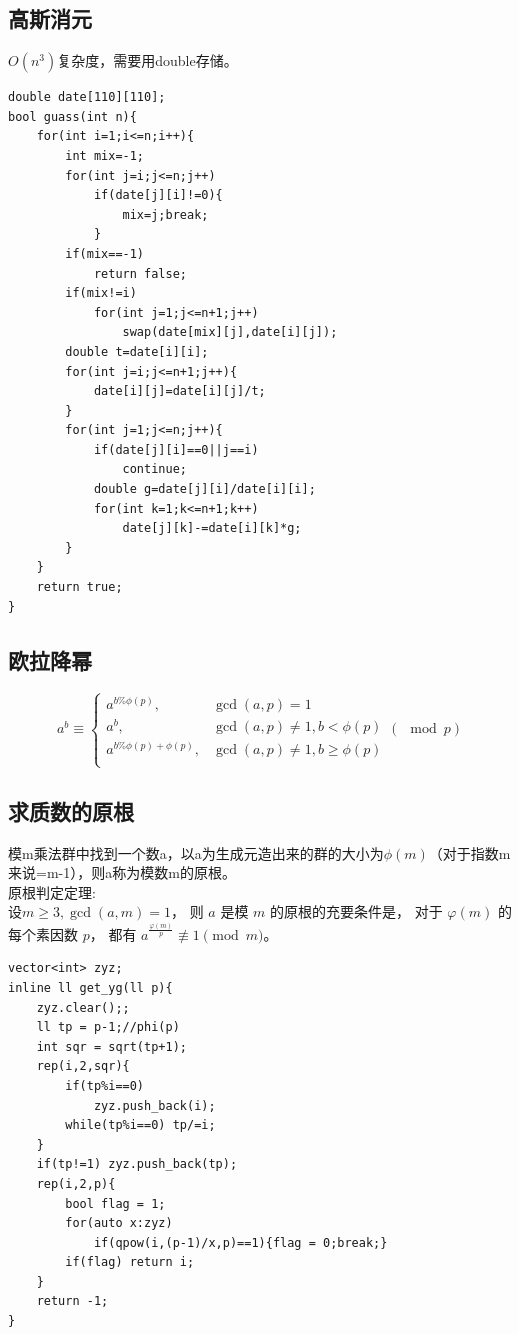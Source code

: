 \documentclass[a4]{ctexart}
\begin{document}
\subsection{高斯消元}
$O(n^3)$复杂度，需要用double存储。
\begin{lstlisting}
double date[110][110];
bool guass(int n){
    for(int i=1;i<=n;i++){
        int mix=-1;
        for(int j=i;j<=n;j++)
            if(date[j][i]!=0){
                mix=j;break;
            }
        if(mix==-1)
            return false;
        if(mix!=i)
            for(int j=1;j<=n+1;j++)
                swap(date[mix][j],date[i][j]);
        double t=date[i][i];
        for(int j=i;j<=n+1;j++){
            date[i][j]=date[i][j]/t;
        }
        for(int j=1;j<=n;j++){
            if(date[j][i]==0||j==i)
                continue;
            double g=date[j][i]/date[i][i];
            for(int k=1;k<=n+1;k++)
                date[j][k]-=date[i][k]*g;
        }
    }                                                                         
    return true;
}
\end{lstlisting}

\subsection{欧拉降幂}
$$
a^b \equiv \begin{cases}
a^{b\%\phi(p)} , & \gcd(a,p)=1\\
a^b , & \gcd(a,p)\neq 1,b<\phi(p)\\
a^{b\%\phi(p)+\phi(p)} , & \gcd(a,p)\neq 1 , b\geq \phi(p)\\
\end{cases}
(\mod p)
$$

\subsection{求质数的原根}
模m乘法群中找到一个数a，以a为生成元造出来的群的大小为$\phi(m)$（对于指数m来说=m-1），则a称为模数m的原根。\\
原根判定定理:\\
设$m \geq 3, \gcd(a,m)=1$，
则 $a$ 是模 $m$ 的原根的充要条件是，
对于 $\varphi(m)$ 的每个素因数 $p$，
都有 $a^{\frac{\varphi(m)}{p}}\not\equiv 1\pmod m$。
\begin{lstlisting}
vector<int> zyz;
inline ll get_yg(ll p){
    zyz.clear();;
    ll tp = p-1;//phi(p)
    int sqr = sqrt(tp+1);
    rep(i,2,sqr){
        if(tp%i==0)
            zyz.push_back(i);
        while(tp%i==0) tp/=i;
    }
    if(tp!=1) zyz.push_back(tp);
    rep(i,2,p){
        bool flag = 1;
        for(auto x:zyz)
            if(qpow(i,(p-1)/x,p)==1){flag = 0;break;}
        if(flag) return i;
    }
    return -1;
}
\end{lstlisting}
\end{document}
